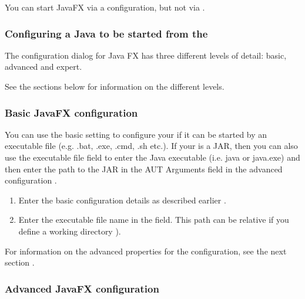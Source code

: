 You can start JavaFX \gdauts{} via a configuration, but not via .


\subsubsection{Configuring a Java \gdaut{} to be started from the \ite{}}
\label{TasksConfigureFXAUT}

The \gdaut{} configuration dialog for Java FX has three different levels of detail: basic, advanced and expert. 

See the sections below for information on the different levels. 

\subsubsection{Basic JavaFX \gdaut{} configuration}

You can use the basic setting to configure your \gdaut{} if it can be started by an executable file (e.g. .bat, .exe, .cmd, .sh etc.). 
If your \gdaut{} is a JAR, then you can also use the executable file field to enter the Java executable (i.e. java or java.exe) and then enter the path to the JAR in the AUT Arguments field in the advanced configuration .


\begin{enumerate}
\item Enter the basic configuration details as described earlier .
\item Enter the executable file name in the  field. This path can be relative if you define a working directory ).
  
\end{enumerate}
For information on the advanced properties for the \gdaut{} configuration, see the next section . 


\subsubsection{Advanced JavaFX \gdaut{} configuration}
\label{AdvancedAUTConfig}

